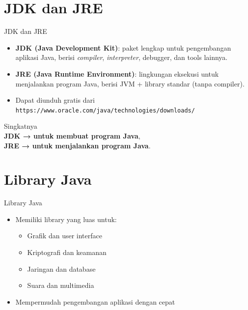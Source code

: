 \documentclass{beamer}
\begin{document}
\section{JDK dan JRE}
\begin{frame}{JDK dan JRE}
  \begin{itemize}
    \item \textbf{JDK (Java Development Kit)}: paket lengkap untuk pengembangan aplikasi Java, berisi \textit{compiler}, \textit{interpreter}, debugger, dan tools lainnya.
    \item \textbf{JRE (Java Runtime Environment)}: lingkungan eksekusi untuk menjalankan program Java, berisi JVM + library standar (tanpa compiler).
    \item Dapat diunduh gratis dari \texttt{https://www.oracle.com/java/technologies/downloads/}
  \end{itemize}
  \begin{block}{Singkatnya\\}
    \textbf{JDK → untuk membuat program Java},  
    \textbf{\\JRE → untuk menjalankan program Java}.
  \end{block}
\end{frame}

\section{Library Java}
\begin{frame}{Library Java}
  \begin{itemize}
    \item Memiliki library yang luas untuk:
    \begin{itemize}
      \item Grafik dan user interface
      \item Kriptografi dan keamanan
      \item Jaringan dan database
      \item Suara dan multimedia
    \end{itemize}
    \item Mempermudah pengembangan aplikasi dengan cepat
  \end{itemize}
\end{frame}

\end{document}
